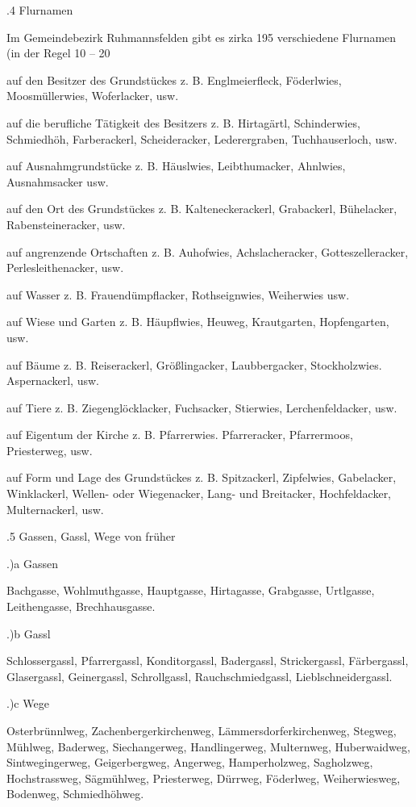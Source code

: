 .4 Flurnamen

Im Gemeindebezirk Ruhmannsfelden gibt es zirka 195 verschiedene Flurnamen (in
der Regel 10 – 20%



auf den Besitzer des Grundstückes z. B. Englmeierfleck, Föderlwies,
Moosmüllerwies, Woferlacker, usw.

auf die berufliche Tätigkeit des Besitzers z. B. Hirtagärtl, Schinderwies,
Schmiedhöh, Farberackerl, Scheideracker, Lederergraben, Tuchhauserloch, usw.

auf Ausnahmgrundstücke z. B. Häuslwies, Leibthumacker, Ahnlwies, Ausnahmsacker
usw.

auf den Ort des Grundstückes z. B. Kalteneckerackerl, Grabackerl, Bühelacker,
Rabensteineracker, usw.

auf angrenzende Ortschaften z. B. Auhofwies, Achslacheracker, Gotteszelleracker,
Perlesleithenacker, usw.

auf Wasser z. B. Frauendümpflacker, Rothseignwies, Weiherwies usw.

auf Wiese und Garten z. B. Häupflwies, Heuweg, Krautgarten, Hopfengarten, usw.

auf Bäume z. B. Reiserackerl, Größlingacker, Laubbergacker, Stockholzwies.
Aspernackerl, usw.

auf Tiere z. B. Ziegenglöcklacker, Fuchsacker, Stierwies, Lerchenfeldacker, usw.

auf Eigentum der Kirche z. B. Pfarrerwies. Pfarreracker, Pfarrermoos,
Priesterweg, usw.

auf Form und Lage des Grundstückes z. B. Spitzackerl, Zipfelwies, Gabelacker,
Winklackerl, Wellen- oder Wiegenacker, Lang- und Breitacker, Hochfeldacker,
Multernackerl, usw.



.5 Gassen, Gassl, Wege von früher

.)a Gassen

Bachgasse, Wohlmuthgasse, Hauptgasse, Hirtagasse, Grabgasse, Urtlgasse,
Leithengasse, Brechhausgasse.

.)b Gassl

Schlossergassl, Pfarrergassl, Konditorgassl, Badergassl, Strickergassl,
Färbergassl, Glasergassl, Geinergassl, Schrollgassl, Rauchschmiedgassl,
Lieblschneidergassl.

.)c Wege

Osterbrünnlweg, Zachenbergerkirchenweg, Lämmersdorferkirchenweg, Stegweg,
Mühlweg, Baderweg, Siechangerweg, Handlingerweg, Multernweg, Huberwaidweg,
Sintwegingerweg, Geigerbergweg, Angerweg, Hamperholzweg, Sagholzweg,
Hochstrassweg, Sägmühlweg, Priesterweg, Dürrweg, Föderlweg, Weiherwiesweg,
Bodenweg, Schmiedhöhweg.

